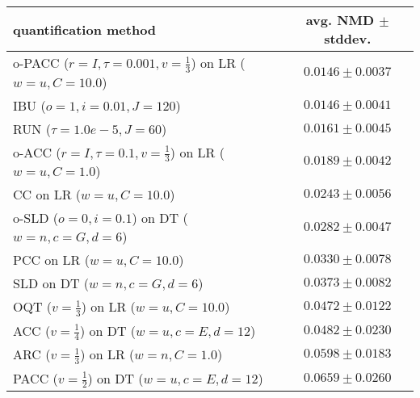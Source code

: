 \begin{tabular}{lc}
  \toprule
  quantification method & avg. NMD $\pm$ stddev. \\
  \midrule
  o-PACC ($r=I, \tau=0.001, v=\frac{1}{3}$) on LR ($w=u, C=10.0$) & $\mathbf{0.0146 \pm 0.0037}$ \\
  IBU ($o=1, i=0.01, J=120$) & $\mathbf{0.0146 \pm 0.0041}$ \\
  RUN ($\tau=1.0e-5, J=60$) & $0.0161 \pm 0.0045$ \\
  o-ACC ($r=I, \tau=0.1, v=\frac{1}{3}$) on LR ($w=u, C=1.0$) & $0.0189 \pm 0.0042$ \\
  CC on LR ($w=u, C=10.0$) & $0.0243 \pm 0.0056$ \\
  o-SLD ($o=0, i=0.1$) on DT ($w=n, c=G, d=6$) & $0.0282 \pm 0.0047$ \\
  PCC on LR ($w=u, C=10.0$) & $0.0330 \pm 0.0078$ \\
  SLD on DT ($w=n, c=G, d=6$) & $0.0373 \pm 0.0082$ \\
  OQT ($v=\frac{1}{3}$) on LR ($w=u, C=10.0$) & $0.0472 \pm 0.0122$ \\
  ACC ($v=\frac{1}{4}$) on DT ($w=u, c=E, d=12$) & $0.0482 \pm 0.0230$ \\
  ARC ($v=\frac{1}{3}$) on LR ($w=n, C=1.0$) & $0.0598 \pm 0.0183$ \\
  PACC ($v=\frac{1}{2}$) on DT ($w=u, c=E, d=12$) & $0.0659 \pm 0.0260$ \\
  \bottomrule
\end{tabular}
